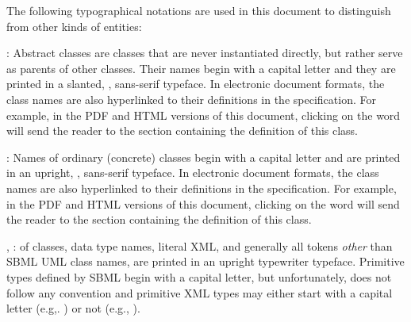 The following typographical notations are used in this document to
distinguish  from other kinds of entities:

\begin{description}
  
\item {}: Abstract classes are classes
  that are never instantiated directly, but rather serve as
  parents of other classes.  Their names begin with a capital
  letter and they are printed in a slanted, ,
  sans-serif typeface.  In electronic document formats, the class
  names are also hyperlinked to their definitions in the
  specification.  For example, in the PDF and HTML versions of
  this document, clicking on the word \SBase will send the reader
  to the section containing the definition of this class.
  
\item {}: Names of ordinary (concrete) classes begin
  with a capital letter and are printed in an upright,
  , sans-serif typeface.  In electronic document
  formats, the class names are also hyperlinked to their
  definitions in the specification.  For example, in the PDF and
  HTML versions of this document, clicking on the word \Species
  will send the reader to the section containing the definition of
  this class.

\item {}, : 
  of classes, data type names, literal XML, and generally all
  tokens \emph{other} than SBML UML class names, are printed in an
  upright typewriter typeface.  Primitive types defined by SBML
  begin with a capital letter, but unfortunately, \xmlschemaone
  does not follow any convention and primitive XML types may
  either start with a capital letter (e.g,.  ) or not
  (e.g., ).

\end{description}


